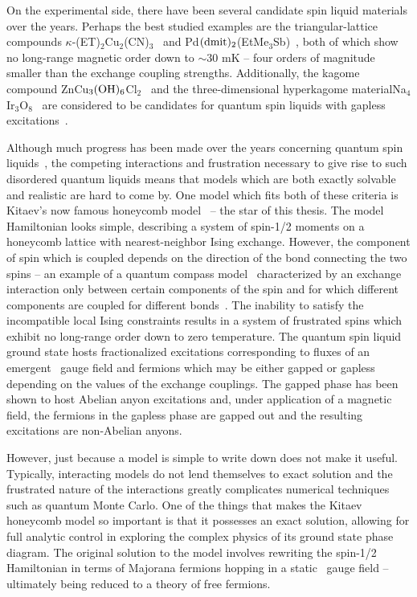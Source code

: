 On the experimental side, there have been several candidate spin liquid materials over the years.
Perhaps the best studied examples are the triangular-lattice compounds $\kappa$-(ET)$_2$Cu$_2$(CN)$_3$~\cite{ShimizuPRL2003} and Pd$({\rm dmit})_2$(EtMe$_3$Sb)~\cite{ItouPRB2008}, both of which show no long-range magnetic order down to $\sim 30$ mK -- four orders of magnitude smaller than the exchange coupling strengths.
Additionally, the kagome compound ZnCu$_3({\rm OH})_6$Cl$_2$~\cite{HeltonPRL2007} and the three-dimensional hyperkagome material\linebreak Na$_4$Ir$_3$O$_8$~\cite{OkamotoPRL2007} are considered to be candidates for quantum spin liquids with gapless excitations~\cite{OlariuPRL2008,ImaiPRL2008,LawlerPRL2008,ZhouPRL2008}.

Although much progress has been made over the years concerning quantum spin liquids~\cite{SavaryRPP2016}, the competing interactions and frustration necessary to give rise to such disordered quantum liquids means that models which are both exactly solvable and realistic are hard to come by.
One model which fits both of these criteria is Kitaev's now famous honeycomb model~\cite{KitaevAoP2006} -- the star of this thesis.
The model Hamiltonian looks simple, describing a system of spin-1/2 moments on a honeycomb lattice with nearest-neighbor Ising exchange.
However, the component of spin which is coupled depends on the direction of the bond connecting the two spins -- an example of a quantum compass model~\cite{KugelSPU1982} characterized by an exchange interaction only between certain components of the spin and for which different components are coupled for different bonds~\cite{NussinovRMP2015}.
The inability to satisfy the incompatible local Ising constraints results in a system of frustrated spins which exhibit no long-range order down to zero temperature.
The quantum spin liquid ground state hosts fractionalized excitations corresponding to fluxes of an emergent \ZZ~gauge field and fermions which may be either gapped or gapless depending on the values of the exchange couplings.
The gapped phase has been shown to host Abelian anyon excitations and, under application of a magnetic field, the fermions in the gapless phase are gapped out and the resulting excitations are non-Abelian anyons.

However, just because a model is simple to write down does not make it useful.
Typically, interacting models do not lend themselves to exact solution and the frustrated nature of the interactions greatly complicates numerical techniques such as quantum Monte Carlo.
One of the things that makes the Kitaev honeycomb model so important is that it possesses an exact solution, allowing for full analytic control in exploring the complex physics of its ground state phase diagram.
The original solution to the model involves rewriting the spin-1/2 Hamiltonian in terms of Majorana fermions hopping in a static \ZZ~gauge field -- ultimately being reduced to a theory of free fermions.

